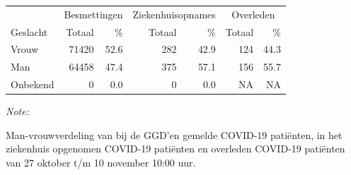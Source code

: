 \documentclass[
  english,
  man,floatsintext]{apa6}
\begin{document}
\begin{table}
\centering\begingroup\fontsize{11}{13}\selectfont

\begin{threeparttable}
\begin{tabular}{lrrrrrr}
\toprule
\multicolumn{1}{c}{ } & \multicolumn{2}{c}{Besmettingen} & \multicolumn{2}{c}{Ziekenhuisopnames} & \multicolumn{2}{c}{Overleden} \\
\cmidrule(l{3pt}r{3pt}){2-3} \cmidrule(l{3pt}r{3pt}){4-5} \cmidrule(l{3pt}r{3pt}){6-7}
Geslacht & Totaal & \% & Totaal & \% & Totaal & \%\\
\midrule
Vrouw & 71420 & 52.6 & 282 & 42.9 & 124 & 44.3\\
Man & 64458 & 47.4 & 375 & 57.1 & 156 & 55.7\\
Onbekend & 0 & 0.0 & 0 & 0.0 & NA & NA\\
\bottomrule
\end{tabular}
\begin{tablenotes}
\item \textit{Note: } 
\item Man-vrouwverdeling van bij de GGD’en gemelde COVID-19 patiënten, in het ziekenhuis opgenomen COVID-19 patiënten en overleden COVID-19 patiënten van 27 oktober t/m 10 november 10:00 uur.
\end{tablenotes}
\end{threeparttable}
\endgroup{}
\end{table}
\newpage
\end{document}
